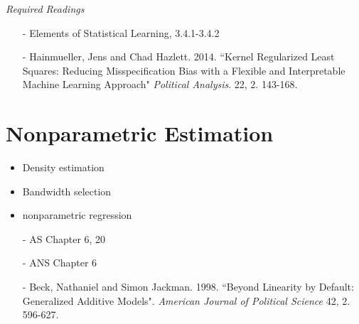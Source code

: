 \documentclass{article}
\begin{document}
\textit{Required Readings}
\begin{itemize}
\item[-] Elements of Statistical Learning, 3.4.1-3.4.2
\item[-] Hainmueller, Jens and Chad Hazlett. 2014.  ``Kernel Regularized Least Squares: Reducing Misspecification Bias with a Flexible and Interpretable Machine Learning Approach" \emph{Political Analysis}. 22, 2. 143-168. 
\end{itemize}

\section{Nonparametric Estimation}

\begin{itemize}
\item Density estimation
\item Bandwidth selection 
\item nonparametric regression
\end{itemize}


\begin{itemize}
\item[-] AS Chapter 6, 20
\item[-] ANS Chapter 6
\item[-] Beck, Nathaniel and Simon Jackman. 1998. ``Beyond Linearity by Default: Generalized Additive Models". \emph{American Journal of Political Science} 42, 2. 596-627.
\end{itemize}
\end{document}
